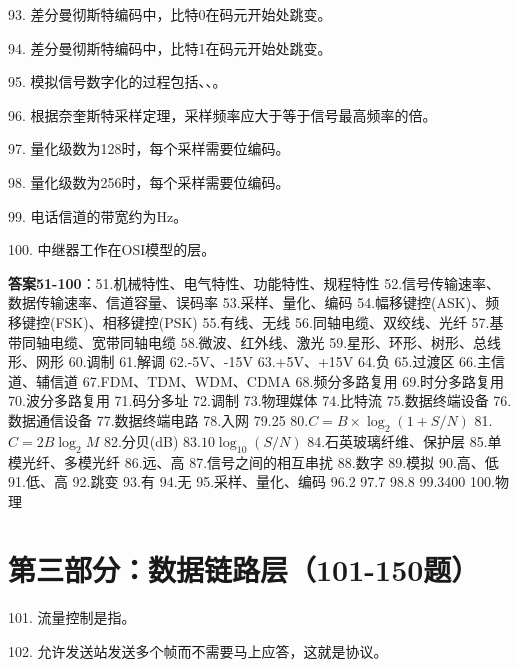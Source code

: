 93. 差分曼彻斯特编码中，比特0在码元开始处\underline{\hspace{2cm}}跳变。

94. 差分曼彻斯特编码中，比特1在码元开始处\underline{\hspace{2cm}}跳变。

95. 模拟信号数字化的过程包括\underline{\hspace{2cm}}、\underline{\hspace{2cm}}、\underline{\hspace{2cm}}。

96. 根据奈奎斯特采样定理，采样频率应大于等于信号最高频率的\underline{\hspace{2cm}}倍。

97. 量化级数为128时，每个采样需要\underline{\hspace{2cm}}位编码。

98. 量化级数为256时，每个采样需要\underline{\hspace{2cm}}位编码。

99. 电话信道的带宽约为\underline{\hspace{2cm}}Hz。

100. 中继器工作在OSI模型的\underline{\hspace{2cm}}层。

\textbf{答案51-100}：51.机械特性、电气特性、功能特性、规程特性 52.信号传输速率、数据传输速率、信道容量、误码率 53.采样、量化、编码 54.幅移键控(ASK)、频移键控(FSK)、相移键控(PSK) 55.有线、无线 56.同轴电缆、双绞线、光纤 57.基带同轴电缆、宽带同轴电缆 58.微波、红外线、激光 59.星形、环形、树形、总线形、网形 60.调制 61.解调 62.-5V、-15V 63.+5V、+15V 64.负 65.过渡区 66.主信道、辅信道 67.FDM、TDM、WDM、CDMA 68.频分多路复用 69.时分多路复用 70.波分多路复用 71.码分多址 72.调制 73.物理媒体 74.比特流 75.数据终端设备 76.数据通信设备 77.数据终端电路 78.入网 79.25 80.$C=B\times\log_2(1+S/N)$ 81.$C=2B\log_2M$ 82.分贝(dB) 83.$10\log_{10}(S/N)$ 84.石英玻璃纤维、保护层 85.单模光纤、多模光纤 86.远、高 87.信号之间的相互串扰 88.数字 89.模拟 90.高、低 91.低、高 92.跳变 93.有 94.无 95.采样、量化、编码 96.2 97.7 98.8 99.3400 100.物理


\section{第三部分：数据链路层（101-150题）}

101. 流量控制是指\underline{\hspace{6cm}}。

102. 允许发送站发送多个帧而不需要马上应答，这就是\underline{\hspace{2cm}}协议。

